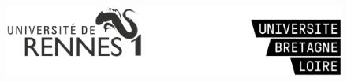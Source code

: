 \documentclass[10pt]{book}
\begin{document}



\newlength{\plarg}
\setlength{\plarg}{8cm}
\newlength{\glarg}
\setlength{\glarg}{14cm}
\newlength{\Glarg}
\setlength{\Glarg}{15cm}

\begin{titlepage}
\thispagestyle{empty}

\vspace{-1cm}
\begin{minipage}{\glarg}
\vspace{-4.5cm}
\end{minipage}
\vspace{-2cm}
\begin{figure}[htp]
\center
\hspace{-1cm}\includegraphics[angle=0,width=15cm]{logo.png}
\end{figure}


\end{titlepage}
\end{document}
